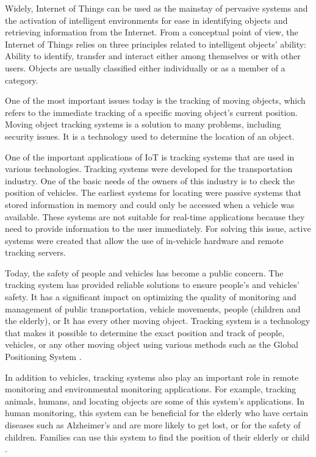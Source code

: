 Widely, Internet of Things can be used as the mainstay of pervasive systems and the activation of intelligent environments for ease in identifying objects and retrieving information from the Internet.
From a conceptual point of view, the Internet of Things relies on three principles related to intelligent objects' ability:
Ability to identify, transfer and interact either among themselves or with other users. Objects are usually classified either individually or as a member of a category.

One of the most important issues today is the tracking of moving objects, which refers to the immediate tracking of a specific moving object's current position. Moving object tracking systems is a solution to many problems, including security issues. It is a technology used to determine the location of an object.

One of the important applications of IoT is tracking systems that are used in various technologies. Tracking systems were developed for the transportation industry. One of the basic needs of the owners of this industry is to check the position of vehicles. The earliest systems for locating were passive systems that stored information in memory and could only be accessed when a vehicle was available. These systems are not suitable for real-time applications because they need to provide information to the user immediately. For solving this issue, active systems were created that allow the use of in-vehicle hardware and remote tracking servers.

Today, the safety of people and vehicles has become a public concern. The tracking system has provided reliable solutions to ensure people's and vehicles' safety. It has a significant impact on optimizing the quality of monitoring and management of public transportation, vehicle movements, people (children and the elderly), or It has every other moving object. Tracking system is a technology that makes it possible to determine the exact position and track of people, vehicles, or any other moving object using various methods such as the Global Positioning System \cite{3}.

In addition to vehicles, tracking systems also play an important role in remote monitoring and environmental monitoring applications. For example, tracking animals, humans, and locating objects are some of this system's applications. In human monitoring, this system can be beneficial for the elderly who have certain diseases such as Alzheimer's and are more likely to get lost, or for the safety of children. Families can use this system to find the position of their elderly or child \cite{4}.

